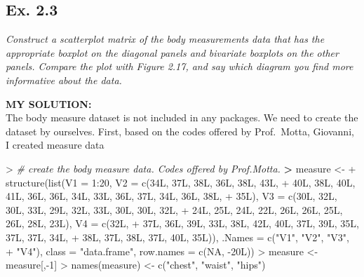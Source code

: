 \documentclass[
]{article}
\newenvironment{Shaded}{\begin{snugshade}}{\end{snugshade}}
\newcommand{\AttributeTok}[1]{\textcolor[rgb]{0.77,0.63,0.00}{#1}}
\newcommand{\CommentTok}[1]{\textcolor[rgb]{0.56,0.35,0.01}{\textit{#1}}}
\newcommand{\ConstantTok}[1]{\textcolor[rgb]{0.00,0.00,0.00}{#1}}
\newcommand{\DecValTok}[1]{\textcolor[rgb]{0.00,0.00,0.81}{#1}}
\newcommand{\ErrorTok}[1]{\textcolor[rgb]{0.64,0.00,0.00}{\textbf{#1}}}
\newcommand{\FunctionTok}[1]{\textcolor[rgb]{0.00,0.00,0.00}{#1}}
\newcommand{\NormalTok}[1]{#1}
\newcommand{\OtherTok}[1]{\textcolor[rgb]{0.56,0.35,0.01}{#1}}
\newcommand{\SpecialCharTok}[1]{\textcolor[rgb]{0.00,0.00,0.00}{#1}}
\newcommand{\StringTok}[1]{\textcolor[rgb]{0.31,0.60,0.02}{#1}}
\begin{document}
\hypertarget{ex.-2.3}{%
\subsection{Ex. 2.3}\label{ex.-2.3}}

\emph{Construct a scatterplot matrix of the body measurements data that
has the appropriate boxplot on the diagonal panels and bivariate
boxplots on the other panels. Compare the plot with Figure 2.17, and say
which diagram you find more informative about the data.}

\textbf{MY SOLUTION:}\\
The body measure dataset is not included in any packages. We need to
create the dataset by ourselves. First, based on the codes offered by
Prof.~Motta, Giovanni, I created measure data

\begin{Shaded}
\begin{Highlighting}[]
\SpecialCharTok{\textgreater{}} \CommentTok{\# create the  body measure data. Codes offered by Prof.Motta.}
\ErrorTok{\textgreater{}}\NormalTok{ measure }\OtherTok{\textless{}{-}}
\SpecialCharTok{+}   \FunctionTok{structure}\NormalTok{(}\FunctionTok{list}\NormalTok{(}\AttributeTok{V1 =} \DecValTok{1}\SpecialCharTok{:}\DecValTok{20}\NormalTok{, }\AttributeTok{V2 =} \FunctionTok{c}\NormalTok{(34L, 37L, 38L, 36L, 38L, 43L,}
\SpecialCharTok{+}\NormalTok{                  40L, 38L, 40L, 41L, 36L, 36L, 34L, 33L, 36L, 37L, 34L, 36L, 38L,}
\SpecialCharTok{+}\NormalTok{                  35L), }\AttributeTok{V3 =} \FunctionTok{c}\NormalTok{(30L, 32L, 30L, 33L, 29L, 32L, 33L, 30L, 30L, 32L,}
\SpecialCharTok{+}\NormalTok{                  24L, 25L, 24L, 22L, 26L, 26L, 25L, 26L, 28L, 23L), }\AttributeTok{V4 =} \FunctionTok{c}\NormalTok{(32L,}
\SpecialCharTok{+}\NormalTok{                  37L, 36L, 39L, 33L, 38L, 42L, 40L, 37L, 39L, 35L, 37L, 37L, 34L,}
\SpecialCharTok{+}\NormalTok{                  38L, 37L, 38L, 37L, 40L, 35L)), }\AttributeTok{.Names =} \FunctionTok{c}\NormalTok{(}\StringTok{"V1"}\NormalTok{, }\StringTok{"V2"}\NormalTok{, }\StringTok{"V3"}\NormalTok{,}
\SpecialCharTok{+}                  \StringTok{"V4"}\NormalTok{), }\AttributeTok{class =} \StringTok{"data.frame"}\NormalTok{, }\AttributeTok{row.names =} \FunctionTok{c}\NormalTok{(}\ConstantTok{NA}\NormalTok{, }\SpecialCharTok{{-}}\NormalTok{20L))}
\SpecialCharTok{\textgreater{}}\NormalTok{ measure }\OtherTok{\textless{}{-}}\NormalTok{ measure[,}\SpecialCharTok{{-}}\DecValTok{1}\NormalTok{]}
\SpecialCharTok{\textgreater{}} \FunctionTok{names}\NormalTok{(measure) }\OtherTok{\textless{}{-}} \FunctionTok{c}\NormalTok{(}\StringTok{"chest"}\NormalTok{, }\StringTok{"waist"}\NormalTok{, }\StringTok{"hips"}\NormalTok{)}

\end{Highlighting}
\end{Shaded}
\end{document}
